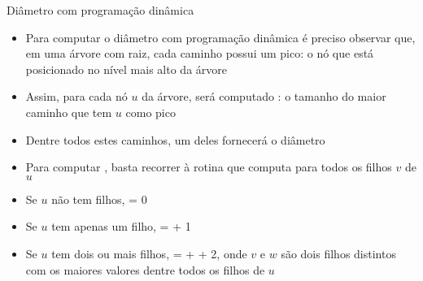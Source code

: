 \begin{frame}[fragile]{Diâmetro com programação dinâmica}

    \begin{itemize}
        \item Para computar o diâmetro com programação dinâmica é preciso observar que, em
            uma árvore com raiz, cada caminho possui um pico: o nó que está posicionado no nível
            mais alto da árvore

        \item Assim, para cada nó $u$ da árvore, será computado : o tamanho
            do maior caminho que tem $u$ como pico

        \item Dentre todos estes caminhos, um deles fornecerá o diâmetro

        \item Para computar , basta recorrer à rotina que computa
             para todos os filhos $v$ de $u$

        \item Se $u$ não tem filhos,  = 0
        \item Se $u$ tem apenas um filho,  =  + 1
        \item Se $u$ tem dois ou mais filhos,  =  + 
             + 2, onde $v$ e $w$ são dois filhos distintos com os maiores
            valores  dentre todos os filhos de $u$

    \end{itemize}

\end{frame}

